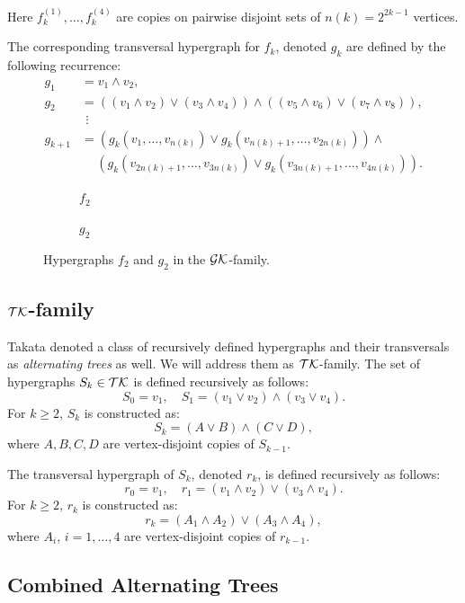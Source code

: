 Here $f_k^{(1)},\ldots,f_k^{(4)}$ are copies on pairwise disjoint sets of $n(k)=2^{2k-1}$ vertices.

The corresponding transversal hypergraph for $f_k$, denoted $g_k$ are defined by the following recurrence:
\begin{align*}
g_1&=v_1\wedge v_2,\\
g_2&=((v_1\wedge v_2)\vee(v_3\wedge v_4))\wedge((v_5\wedge v_6)\vee(v_7\wedge v_8)),\\
&\ \,\vdots\\
g_{k+1}&=(g_k(v_1,\dots,v_{n(k)})\vee g_k(v_{n(k)+1},\dots,v_{2n(k)}))\wedge\\
&\quad\ (g_k(v_{2n(k)+1},\dots,v_{3n(k)})\vee g_k(v_{3n(k)+1},\dots,v_{4n(k)})).
\end{align*}

\begin{figure}[h]
\centering
\begin{subfigure}{0.42\linewidth}\centering\caption{$f_2$}\end{subfigure}\hfill
\begin{subfigure}{0.5\linewidth}\centering\caption{$g_2$}\end{subfigure}
\caption{Hypergraphs $f_2$ and $g_2$ in the $\mathcal{GK}$-family.}
\end{figure}

\subsection{\texorpdfstring{$\mathcal{TK}$}{TK}-family}

Takata denoted a class of recursively defined hypergraphs and their transversals as \emph{alternating trees} as well. We will address them as $\mathcal{TK}$-family. The set of hypergraphs $S_k\in\mathcal{TK}$ is defined recursively as follows:
\[
S_0=v_1,\quad S_1=(v_1\vee v_2)\wedge(v_3\vee v_4).
\]
For $k\geq 2$, $S_k$ is constructed as:
\[
S_k=(A\vee B)\wedge(C\vee D),
\]
where $A,B,C,D$ are vertex-disjoint copies of $S_{k-1}$.

The transversal hypergraph of $S_k$, denoted $r_k$, is defined recursively as follows:
\[
r_0=v_1,\quad r_1=(v_1\wedge v_2)\vee(v_3\wedge v_4).
\]
For $k\geq 2$, $r_k$ is constructed as:
\[
r_k=(A_1\wedge A_2)\vee(A_3\wedge A_4),
\]
where $A_i$, $i=1,\dots,4$ are vertex-disjoint copies of $r_{k-1}$.

\subsection{Combined Alternating Trees}


